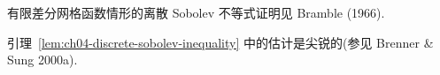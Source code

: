 \setcounter{thmcount}{7}
\begin{Remark}
\label{rem:ch04-finite-difference-discrete-sobolev}
有限差分网格函数情形的离散 Sobolev 不等式证明见 Bramble (1966).
\end{Remark}

\begin{Remark}
\label{rem:ch04-discrete-sobolev-sharpness}
引理~\ref{lem:ch04-discrete-sobolev-inequality} 中的估计是尖锐的(参见 Brenner \& Sung 2000a).
\end{Remark}


